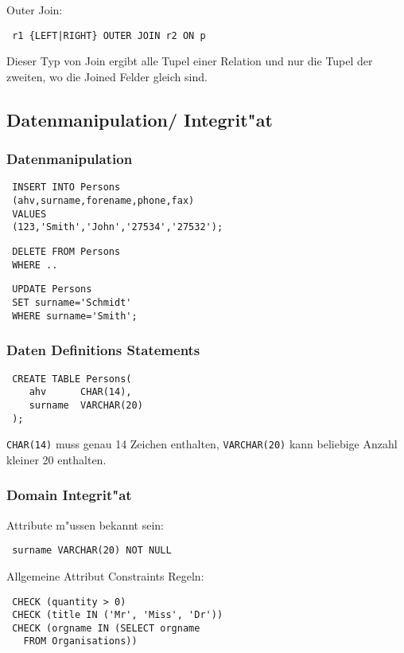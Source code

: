 \documentclass[german, 10pt, a4paper, twocolumn]{scrartcl}
\theoremstyle{definition}
\theoremstyle{remark}
\theoremstyle{example}
\begin{document}
Outer Join:
\begin{verbatim}
 r1 {LEFT|RIGHT} OUTER JOIN r2 ON p
\end{verbatim}
Dieser Typ von Join ergibt alle Tupel einer Relation und nur die Tupel der zweiten, wo die Joined Felder gleich sind.


\subsection{Datenmanipulation/ Integrit"at}

\subsubsection{Datenmanipulation}

\begin{verbatim}
 INSERT INTO Persons
 (ahv,surname,forename,phone,fax)
 VALUES
 (123,'Smith','John','27534','27532');
\end{verbatim}

\begin{verbatim}
 DELETE FROM Persons
 WHERE ..
\end{verbatim}

\begin{verbatim}
 UPDATE Persons
 SET surname='Schmidt'
 WHERE surname='Smith';
\end{verbatim}


\subsubsection{Daten Definitions Statements}

\begin{verbatim}
 CREATE TABLE Persons(
    ahv      CHAR(14),
    surname  VARCHAR(20)
 );
\end{verbatim}

\verb#CHAR(14)# muss genau 14 Zeichen enthalten, \verb#VARCHAR(20)# kann beliebige Anzahl kleiner 20 enthalten.


\subsubsection{Domain Integrit"at}

Attribute m"ussen bekannt sein:
\begin{verbatim}
 surname VARCHAR(20) NOT NULL
\end{verbatim}

Allgemeine Attribut Constraints Regeln:
\begin{verbatim}
 CHECK (quantity > 0)
 CHECK (title IN ('Mr', 'Miss', 'Dr'))
 CHECK (orgname IN (SELECT orgname
   FROM Organisations))
\end{verbatim}
\end{document}
